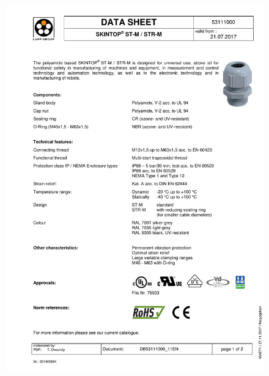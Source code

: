 \documentclass[../main.tex]{subfiles}
\begin{document}
\begin{figure}[H]
	\centering
	\includegraphics[page={2},width=\textwidth]{img/specs/gland.pdf}
\end{figure}

\end{document}
